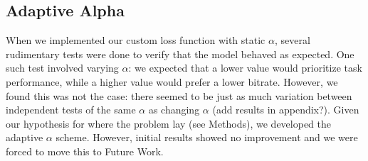 \subsection{Adaptive Alpha}
When we implemented our custom loss function with static $\alpha$, several rudimentary tests were done to verify that the model behaved as expected. One such test involved varying $\alpha$: we expected that a lower value would prioritize task performance, while a higher value would prefer a lower bitrate. However, we found this was not the case: there seemed to be just as much variation between independent tests of the same $\alpha$ as changing $\alpha$ (add results in appendix?). Given our hypothesis for where the problem lay (see Methods), we developed the adaptive $\alpha$ scheme. However, initial results showed no improvement and we were forced to move this to Future Work.
